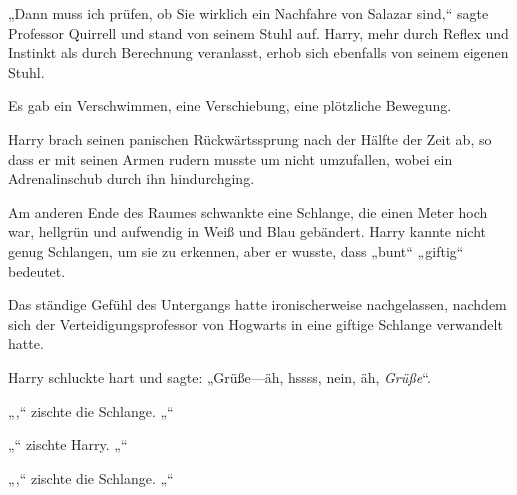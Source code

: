 „Dann muss ich prüfen, ob Sie wirklich ein Nachfahre von Salazar sind,“ sagte Professor Quirrell und stand von seinem Stuhl auf. Harry, mehr durch Reflex und Instinkt als durch Berechnung veranlasst, erhob sich ebenfalls von seinem eigenen Stuhl.

Es gab ein Verschwimmen, eine Verschiebung, eine plötzliche Bewegung.

Harry brach seinen panischen Rückwärtssprung nach der Hälfte der Zeit ab, so dass er mit seinen Armen rudern musste um nicht umzufallen, wobei ein Adrenalinschub durch ihn hindurchging.

Am anderen Ende des Raumes schwankte eine Schlange, die einen Meter hoch war, hellgrün und aufwendig in Weiß und Blau gebändert. Harry kannte nicht genug Schlangen, um sie zu erkennen, aber er wusste, dass „bunt“ „giftig“ bedeutet.

Das ständige Gefühl des Untergangs hatte ironischerweise nachgelassen, nachdem sich der Verteidigungsprofessor von Hogwarts in eine giftige Schlange verwandelt hatte.

Harry schluckte hart und sagte: „Grüße—äh, hssss, nein, äh, \emph{Grüße}“.

„,“ zischte die Schlange. „“

„“ zischte Harry. „“

„,“ zischte die Schlange. „“

